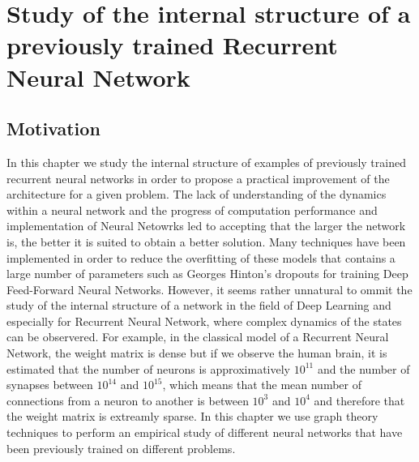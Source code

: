 
\chapter{ Study of the internal structure of a previously trained Recurrent Neural Network} %

\label{Chapter 3} %




\section{Motivation}

In this chapter we study the internal structure of examples of previously trained recurrent neural networks in order to propose a practical improvement of the architecture for a given problem. The lack of understanding of the dynamics within a neural network and the progress of computation performance and implementation of Neural Netowrks led to accepting that the larger the network is, the better it is suited to obtain a better solution. Many techniques have been implemented in order to reduce the overfitting of these models that contains a large number of parameters such as Georges Hinton's dropouts for training Deep Feed-Forward Neural Networks. However, it seems rather unnatural to ommit the study of the internal structure of a network in the field of Deep Learning and especially for Recurrent Neural Network, where complex dynamics of the states can be observered. For example, in the classical model of a Recurrent Neural Network, the weight matrix is dense but if we observe the human brain, it is estimated that the number of neurons is approximatively $10^{11}$ and the number of synapses between $10^{14}$ and $10^{15}$, which means that the mean number of connections from a neuron to another is between $10^3$ and $10^4$ and therefore that the weight matrix is extreamly sparse. In this chapter we use graph theory techniques to perform an empirical study of different neural networks that have been previously trained on different problems. 

